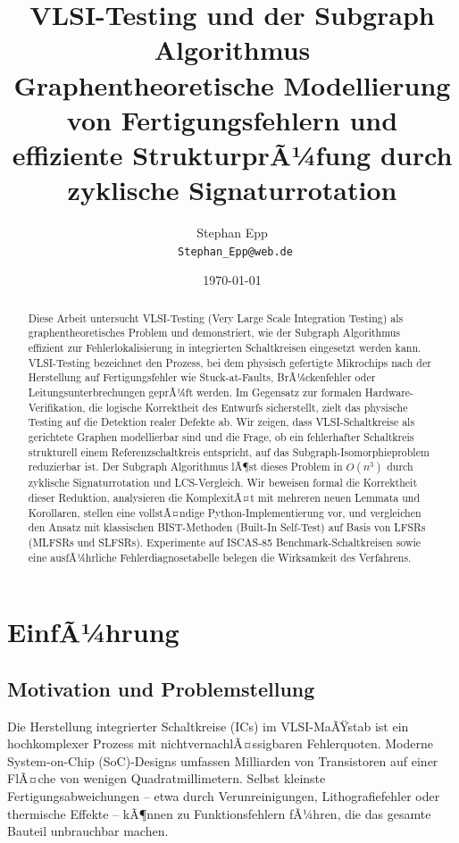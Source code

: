 ﻿\documentclass[a4paper,12pt]{article}
\title{\textbf{VLSI-Testing und der Subgraph Algorithmus}\\[4pt]
\large Graphentheoretische Modellierung von Fertigungs\-fehlern und
effiziente Struktur\-prÃ¼fung durch zyklische Signaturrotation}
\author{Stephan Epp\\[2pt]
\
\small \texttt{Stephan\_Epp@web.de}}
\date{\today}
\theoremstyle{definition}
\begin{document}
\maketitle

\begin{abstract}
Diese Arbeit untersucht VLSI-Testing (Very Large Scale Integration Testing)
als graphentheoretisches Problem und demonstriert, wie der Subgraph
Algorithmus~\cite{epp2026subgraph} effizient zur Fehlerlokalisierung in
integrierten Schaltkreisen eingesetzt werden kann.
VLSI-Testing bezeichnet den Prozess, bei dem physisch gefertigte Mikrochips
nach der Herstellung auf Fertigungsfehler wie Stuck-at-Faults,
BrÃ¼cken\-fehler oder Leitungs\-unter\-brechungen geprÃ¼ft werden.
Im Gegensatz zur formalen Hardware-Verifikation, die logische Korrektheit
des Entwurfs sicherstellt, zielt das physische Testing auf die Detektion
realer Defekte ab.
Wir zeigen, dass VLSI-Schaltkreise als gerichtete Graphen modellierbar sind
und die Frage, ob ein fehlerhafter Schaltkreis strukturell einem
Referenzschaltkreis entspricht, auf das Subgraph-Isomorphieproblem
reduzierbar ist.
Der Subgraph Algorithmus lÃ¶st dieses Problem in $O(n^3)$ durch zyklische
Signaturrotation und LCS-Vergleich.
Wir beweisen formal die Korrektheit dieser Reduktion, analysieren die
KomplexitÃ¤t mit mehreren neuen Lemmata und Korollaren, stellen eine
vollstÃ¤ndige Python-Implementierung vor, und vergleichen den Ansatz mit
klassischen BIST-Methoden (Built-In Self-Test) auf Basis von LFSRs
(MLFSRs und SLFSRs).
Experimente auf ISCAS-85 Benchmark-Schaltkreisen sowie eine ausfÃ¼hrliche
Fehlerdiagnosetabelle belegen die Wirksamkeit des Verfahrens.
\end{abstract}

\tableofcontents
\newpage

\section{EinfÃ¼hrung}

\subsection{Motivation und Problemstellung}

Die Herstellung integrierter Schaltkreise (ICs) im VLSI-MaÃŸstab ist ein
hochkomplexer Prozess mit nichtvern\-achlÃ¤ssigbaren Fehlerquoten. Moderne
System-on-Chip (SoC)-Designs umfassen Milliarden von Transistoren auf einer
FlÃ¤che von wenigen Quadrat\-millimetern. Selbst kleinste
Fertigungs\-abweichungen -- etwa durch Verunreinigungen, Litho\-grafie\-fehler
oder thermische Effekte -- kÃ¶nnen zu Funktions\-fehlern fÃ¼hren, die das
gesamte Bauteil unbrauchbar machen.
\end{document}
